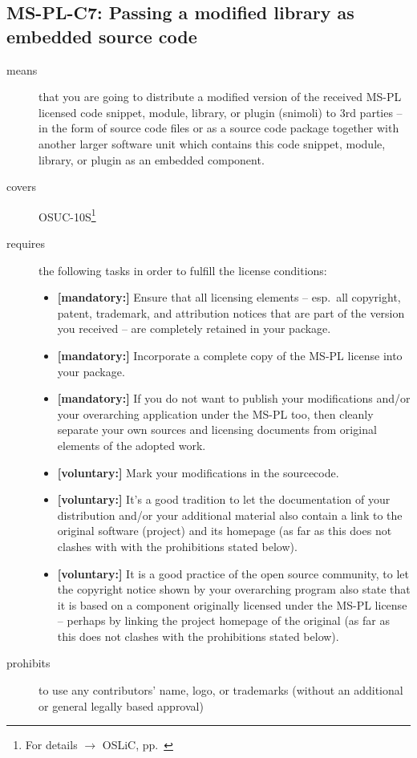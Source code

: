 \subsection{MS-PL-C7: Passing a modified library as embedded source code}
\label{OSUC-10S-MS-PL}
\begin{description}
\item[means] that you are going to distribute a modified version of the received
MS-PL licensed code snippet, module, library, or plugin (snimoli) to 3rd parties
-- in the form of source code files or as a source code package together with
another larger software unit which contains this code snippet, module, library,
or plugin as an embedded component.

\item[covers] OSUC-10S\footnote{For details $\rightarrow$ OSLiC, pp.\
\pageref{OSUC-10S-DEF}}
\item[requires] the following tasks in order to fulfill the license conditions:
\begin{itemize}
 
 \item \textbf{[mandatory:]} Ensure that all licensing elements -- esp.\ all
  copyright, patent, trademark, and attribution notices that are part of the
  version you received -- are completely retained in your package.
 
  \item \textbf{[mandatory:]} Incorporate a complete copy of the MS-PL license
  into your package.
  
  \item \textbf{[mandatory:]} If you do not want to publish your modifications
  and/or your overarching application under the MS-PL too, then cleanly separate
  your own sources and licensing documents from original elements of the adopted
  work.
  
  \item \textbf{[voluntary:]} Mark your modifications in the sourcecode.
  
  \item \textbf{[voluntary:]} It's a good tradition to let the documentation of
  your distribution and/or your additional material also contain a link to the
  original software (project) and its homepage (as far as this does not clashes
  with with the prohibitions stated below).

  \item \textbf{[voluntary:]} It is a good practice of the open source
  community, to let the copyright notice shown by your overarching program also
  state that it is based on a component originally licensed under the MS-PL
  license -- perhaps by linking the project homepage of the original (as far as
  this does not clashes with the prohibitions stated below).
  
\end{itemize}

\item[prohibits] to use any contributors' name, logo, or trademarks (without an
additional or general legally based approval)

\end{description}

